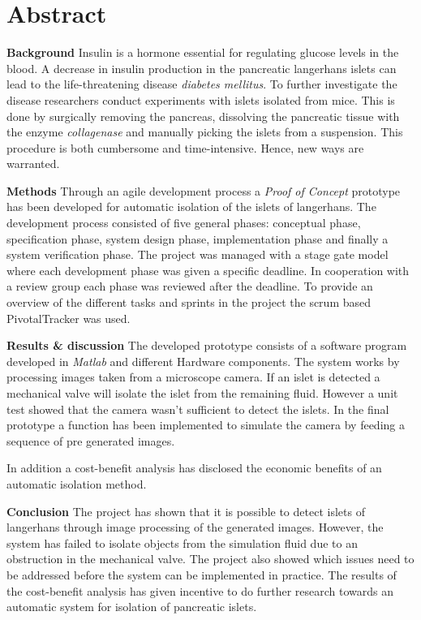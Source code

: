 \section*{Abstract}
\textbf{Background}
Insulin is a hormone essential for regulating glucose levels in the blood. A decrease in insulin production in the pancreatic langerhans islets can lead to the life-threatening disease \textit{diabetes mellitus}. To further investigate the disease researchers conduct experiments with islets isolated from mice. This is done by surgically removing the pancreas, dissolving the pancreatic tissue with the enzyme \textit{collagenase} and manually picking the islets from a suspension. This procedure is both cumbersome and time-intensive. Hence, new ways are warranted.   

\textbf{Methods}
Through an agile development process a \textit{Proof of Concept} prototype has been developed for automatic isolation of the islets of langerhans. The development process consisted of five general phases: conceptual phase,  specification phase, system design phase, implementation phase and finally a system verification phase. The project was managed with a stage gate model where each development phase was given a specific deadline. In cooperation with a review group each phase was reviewed after the deadline. To provide an overview of the different tasks and sprints in the project the scrum based PivotalTracker was used.   


\textbf{Results \& discussion} The developed prototype consists of a software program developed in \textit{Matlab} and different Hardware components.  The system works by processing images taken from a microscope camera. If an islet is detected a mechanical valve will isolate the islet from the remaining fluid. However a unit test showed that the camera wasn't sufficient to detect the islets. In the final prototype a function has been implemented to simulate the camera by feeding a sequence of pre generated images.

In addition a cost-benefit analysis has disclosed the economic benefits of an automatic isolation method.

\textbf{Conclusion}
The project has shown that it is possible to detect islets of langerhans through image processing of the generated images. However, the system has failed to isolate objects from the simulation fluid due to an obstruction in the mechanical valve. The project also showed which issues need to be addressed before the system can be implemented in practice. The results of the cost-benefit analysis has given incentive to do further research towards an automatic system for isolation of pancreatic islets. 